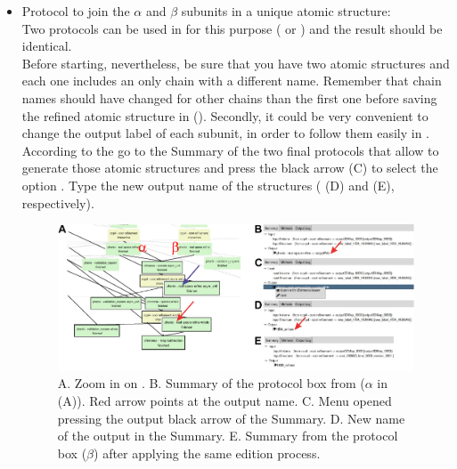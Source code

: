 \begin{itemize}
 \item Protocol to join the  $\alpha$ and $\beta$ subunits in a unique atomic structure:\\ Two protocols can be used in \scipion for this purpose ( or ) and the result should be identical. \\
 Before starting, nevertheless, be sure that you have two atomic structures and each one includes an only chain with a different name. Remember that chain names should have changed for other chains than the first one before saving the refined atomic structure in \coot (). Secondly, it could be very convenient to change the \scipion output label of each subunit, in order to follow them easily in \scipion. According to the  go to the Summary of the two final protocols that allow to generate those atomic structures and press the black arrow (C) to select the option . Type the new output name of the structures ( (D) and  (E), respectively).\\
    
  \begin{figure}[H]
  \centering 
  \captionsetup{width=.9\linewidth} 
  \includegraphics[width=1\textwidth]{Images/Fig75}
  \caption{A. Zoom in on . B. Summary of the protocol box from \phenix {} ($\alpha$ in (A)). Red arrow points at the \scipion output name. C. Menu opened pressing the output black arrow of the Summary. D. New name of the \scipion output in the Summary. E. Summary from the protocol box \phenix {} ($\beta$) after applying the same edition process.}
  \label{fig:scipion_workflow_edition}
  \end{figure}
  

\end{itemize}
